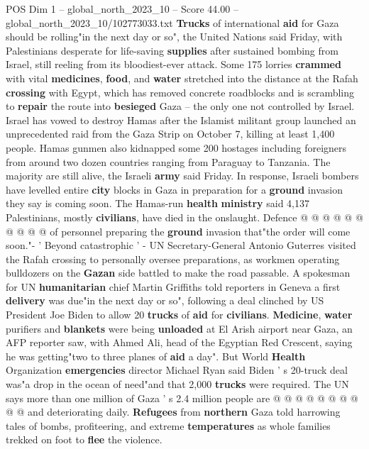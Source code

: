 \begin{textsample}{POS Dim 1 – global\_north\_2023\_10 – Score 44.00 – global\_north\_2023\_10/102773033.txt}  \label{ex:f1_pos_316}
\textbf{Trucks} of international \textbf{aid} for Gaza should be rolling"in the next day or so", the United Nations said Friday, with Palestinians desperate for life-saving \textbf{supplies} after sustained bombing from Israel, still reeling from its bloodiest-ever attack.
Some 175 lorries \textbf{crammed} with vital \textbf{medicines}, \textbf{food}, and \textbf{water} stretched into the distance at the Rafah \textbf{crossing} with Egypt, which has removed concrete roadblocks and is scrambling to \textbf{repair} the route into \textbf{besieged} Gaza -- the only one not controlled by Israel.
Israel has vowed to destroy Hamas after the Islamist militant group launched an unprecedented raid from the Gaza Strip on October 7, killing at least 1,400 people.
Hamas gunmen also kidnapped some 200 hostages including foreigners from around two dozen countries ranging from Paraguay to Tanzania.
The majority are still alive, the Israeli \textbf{army} said Friday.
In response, Israeli bombers have levelled entire \textbf{city} blocks in Gaza in preparation for a \textbf{ground} invasion they say is coming soon.
The Hamas-run \textbf{health} \textbf{ministry} said 4,137 Palestinians, mostly \textbf{civilians}, have died in the onslaught.
Defence @ @ @ @ @ @ @ @ @ @ of personnel preparing the \textbf{ground} invasion that"the order will come soon."- ' Beyond catastrophic ' - UN Secretary-General Antonio Guterres visited the Rafah crossing to personally oversee preparations, as workmen operating bulldozers on the \textbf{Gazan} side battled to make the road passable.
A spokesman for UN \textbf{humanitarian} chief Martin Griffiths told reporters in Geneva a first \textbf{delivery} was due"in the next day or so", following a deal clinched by US President Joe Biden to allow 20 \textbf{trucks} of \textbf{aid} for \textbf{civilians}. \textbf{Medicine}, \textbf{water} purifiers and \textbf{blankets} were being \textbf{unloaded} at El Arish airport near Gaza, an AFP reporter saw, with Ahmed Ali, head of the Egyptian Red Crescent, saying he was getting"two to three planes of \textbf{aid} a day".
But World \textbf{Health} Organization \textbf{emergencies} director Michael Ryan said Biden ' s 20-truck deal was"a drop in the ocean of need"and that 2,000 \textbf{trucks} were required.
The UN says more than one million of Gaza ' s 2.4 million people are @ @ @ @ @ @ @ @ @ @ and deteriorating daily. \textbf{Refugees} from \textbf{northern} Gaza told harrowing tales of bombs, profiteering, and extreme \textbf{temperatures} as whole families trekked on foot to \textbf{flee} the violence.

\end{textsample}
